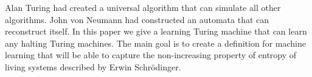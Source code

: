 Alan Turing had created a universal algorithm that can simulate all other algorithms. 
John von Neumann had constructed an automata that can reconstruct itself. 
In this paper we give a learning Turing machine that can learn any halting Turing machines. 
The main goal is to create a definition for machine learning that will be able to capture the non-increasing property of entropy of living systems described by Erwin Schrödinger.